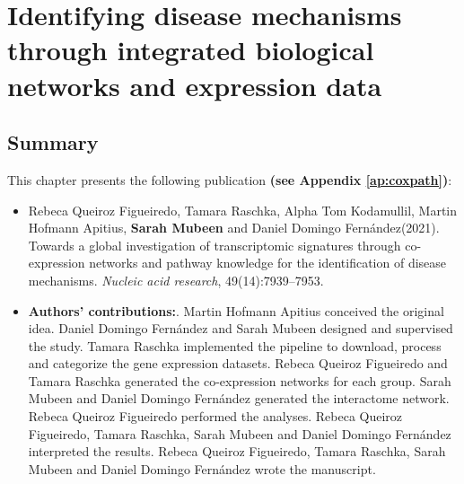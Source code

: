 \chapter{Identifying disease mechanisms through integrated biological networks and expression data}

\label{ch:coxpath}

\section*{Summary}

This chapter presents the following publication \textbf{(see Appendix \ref{ap:coxpath})}:

\begin{itemize}

\item[] Rebeca Queiroz Figueiredo, Tamara Raschka, Alpha Tom Kodamullil, Martin Hofmann Apitius, \textbf{Sarah Mubeen}\footnotemark{} and Daniel Domingo Fernández\footnotemark[\value{footnote}] (2021). Towards a global investigation of transcriptomic signatures through co-expression networks and pathway knowledge for the identification of disease mechanisms. \textit{Nucleic acid research}, 49(14):7939–7953.

\item[] \textbf{Authors' contributions:}. Martin Hofmann Apitius conceived the original idea. Daniel Domingo Fernández and Sarah Mubeen designed and supervised the study. Tamara Raschka implemented the pipeline to download, process and categorize the gene expression datasets. Rebeca Queiroz Figueiredo and Tamara Raschka generated the co-expression networks for each group. Sarah Mubeen and Daniel Domingo Fernández generated the interactome network. Rebeca Queiroz Figueiredo performed the analyses. Rebeca Queiroz Figueiredo, Tamara Raschka, Sarah Mubeen and Daniel Domingo Fernández interpreted the results. Rebeca Queiroz Figueiredo, Tamara Raschka, Sarah Mubeen and Daniel Domingo Fernández wrote the manuscript.

\end{itemize}


